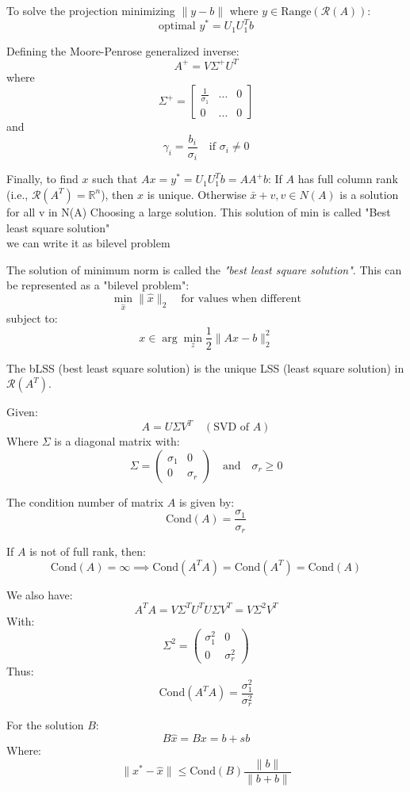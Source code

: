 To solve the projection minimizing $\| y - b \|$ where $y \in \text{Range}(\mathcal{R}(A))$:
\[
\text{optimal } y^* = U_1U_1^Tb
\]

Defining the Moore-Penrose generalized inverse:
\[
A^+ = V \Sigma^+ U^T
\]
where
\[
\Sigma^+ = \begin{bmatrix} \frac{1}{\sigma_1} & \dots & 0 \\ 0 & \dots & 0 \end{bmatrix}
\]
and
\[
\gamma_i = \frac{b_i}{\sigma_i} \quad \text{if } \sigma_i \neq 0
\]

Finally, to find $x$ such that $Ax = y^* = U_1U_1^Tb = AA^+b$:
If $A$ has full column rank (i.e., $\mathcal{R}(A^T) = \mathbb{R}^n$), then $x$ is unique.
Otherwise $\bar{x}+v,v\in N(A)$ is a solution for all v in N(A)
Choosing a large solution. This solution of min is called "Best least square solution"
\\ we can write it as bilevel problem




The solution of minimum norm is called the \textit{"best least square solution"}. This can be represented as a "bilevel problem":
\[
\min_{\hat{x}} \|\hat{x}\|_2 \quad \text{for values when different}
\]
subject to:
\[
x \in \arg\min_{z} \frac{1}{2} \|Ax - b\|_2^2
\]

The bLSS (best least square solution) is the unique LSS (least square solution) in $\mathcal{R}(A^T)$.

Given:
\[
A = U \Sigma V^T \quad (\text{SVD of } A)
\]
Where $\Sigma$ is a diagonal matrix with:
\[
\Sigma = \begin{pmatrix} \sigma_1 & 0 \\ 0 & \sigma_r \end{pmatrix} \quad \text{and} \quad \sigma_r \geq 0
\]

The condition number of matrix $A$ is given by:
\[
\text{Cond}(A) = \frac{\sigma_1}{\sigma_r}
\]

If $A$ is not of full rank, then:
\[
\text{Cond}(A) = \infty \implies \text{Cond}(A^TA) = \text{Cond}(A^T) = \text{Cond}(A)
\]

We also have:
\[
A^TA = V \Sigma^T U^T U \Sigma V^T = V \Sigma^2 V^T
\]
With:
\[
\Sigma^2 = \begin{pmatrix} \sigma_1^2 & 0 \\ 0 & \sigma_r^2 \end{pmatrix}
\]
Thus:
\[
\text{Cond}(A^TA) = \frac{\sigma_1^2}{\sigma_r^2}
\]

For the solution $B$:
\[
B\hat{x} = Bx = b + sb
\]
Where:
\[
\|x^* - \hat{x}\| \leq \text{Cond}(B) \frac{\|b\|}{\|b + b\|}
\]



